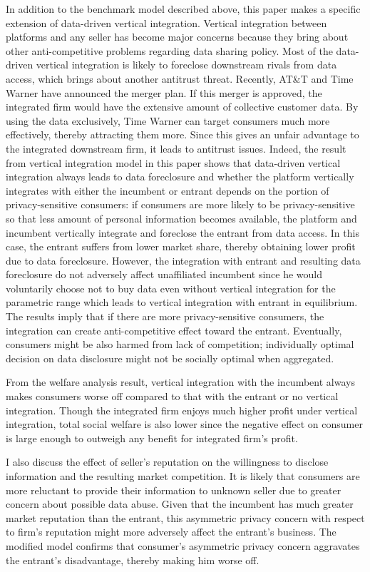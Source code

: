 \documentclass[12pt]{article}
\begin{document}
In addition to the benchmark model described above, this paper makes a specific extension of data-driven vertical integration. Vertical integration between platforms and any seller has become major concerns because they bring about other anti-competitive problems regarding data sharing policy. Most of the data-driven vertical integration is likely to foreclose downstream rivals from data access, which brings about another antitrust threat. Recently, AT\&T and Time Warner have announced the merger plan. If this merger is approved, the integrated firm would have the extensive amount of collective customer data. By using the data exclusively, Time Warner can target consumers much more effectively, thereby attracting them more. Since this gives an unfair advantage to the integrated downstream firm, it leads to antitrust issues. Indeed, the result from vertical integration model in this paper shows that data-driven vertical integration always leads to data foreclosure and whether the platform vertically integrates with either the incumbent or entrant depends on the portion of privacy-sensitive consumers: if consumers are more likely to be privacy-sensitive so that less amount of personal information becomes available, the platform and incumbent vertically integrate and foreclose the entrant from data access. In this case, the entrant suffers from lower market share, thereby obtaining lower profit due to data foreclosure. However, the integration with entrant and resulting data foreclosure do not adversely affect unaffiliated incumbent since he would voluntarily choose not to buy data even without vertical integration for the parametric range which leads to vertical integration with entrant in equilibrium. The results imply that if there are more privacy-sensitive consumers, the integration can create anti-competitive effect toward the entrant. Eventually, consumers might be also harmed from lack of competition; individually optimal decision on data disclosure might not be socially optimal when aggregated.

From the welfare analysis result, vertical integration with the incumbent always makes consumers worse off compared to that with the entrant or no vertical integration. Though the integrated firm enjoys much higher profit under vertical integration, total social welfare is also lower since the negative effect on consumer is large enough to outweigh any benefit for integrated firm's profit. 

I also discuss the effect of seller's reputation on the willingness to disclose information and the resulting market competition. It is likely that consumers are more reluctant to provide their information to unknown seller due to greater concern about possible data abuse. Given that the incumbent has much greater market reputation than the entrant, this asymmetric privacy concern with respect to firm's reputation might more adversely affect the entrant's business. The modified model confirms that consumer's asymmetric privacy concern aggravates the entrant's disadvantage, thereby making him worse off. 
\end{document}
